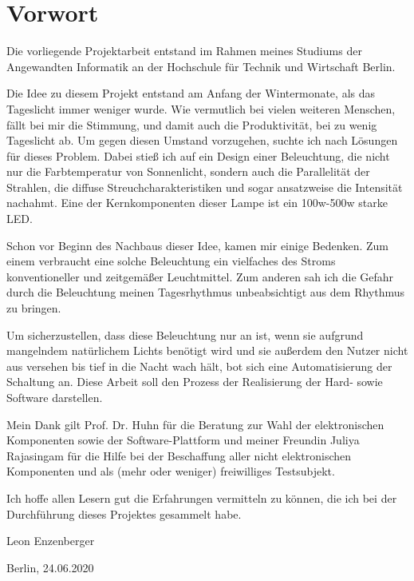 \chapter*{Vorwort}

Die vorliegende Projektarbeit entstand im Rahmen meines Studiums der Angewandten Informatik an der Hochschule für Technik und Wirtschaft Berlin.

Die Idee zu diesem Projekt entstand am Anfang der Wintermonate, als das Tageslicht immer weniger wurde. Wie vermutlich bei vielen weiteren Menschen, fällt bei mir die Stimmung, und damit auch die Produktivität, bei zu wenig Tageslicht ab. Um gegen diesen Umstand vorzugehen, suchte ich nach Lösungen für dieses Problem. Dabei stieß ich auf ein Design einer Beleuchtung, die nicht nur die Farbtemperatur von Sonnenlicht, sondern auch die Parallelität der Strahlen, die diffuse Streuchcharakteristiken und sogar ansatzweise die Intensität nachahmt. Eine der Kernkomponenten dieser Lampe ist ein 100w-500w starke LED.

Schon vor Beginn des Nachbaus dieser Idee, kamen mir einige Bedenken. Zum einem verbraucht eine solche Beleuchtung ein vielfaches des Stroms konventioneller und zeitgemäßer Leuchtmittel. Zum anderen sah ich die Gefahr durch die Beleuchtung meinen Tagesrhythmus unbeabsichtigt aus dem Rhythmus zu bringen.

Um sicherzustellen, dass diese Beleuchtung nur an ist, wenn sie aufgrund mangelndem natürlichem Lichts benötigt wird und sie außerdem den Nutzer nicht aus versehen bis tief in die Nacht wach hält, bot sich eine Automatisierung der Schaltung an. Diese Arbeit soll den Prozess der Realisierung der Hard- sowie Software darstellen.

Mein Dank gilt Prof. Dr. Huhn für die Beratung zur Wahl der elektronischen Komponenten sowie der Software-Plattform und meiner Freundin Juliya Rajasingam für die Hilfe bei der Beschaffung aller nicht elektronischen Komponenten und als (mehr oder weniger) freiwilliges Testsubjekt.

Ich hoffe allen Lesern gut die Erfahrungen vermitteln zu können, die ich bei der Durchführung dieses Projektes gesammelt habe.


Leon Enzenberger

Berlin, 24.06.2020

